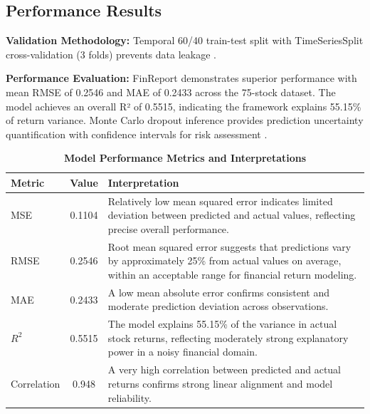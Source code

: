 \documentclass[3p,times,procedia]{elsarticle}
\begin{document}
\subsection{Performance Results}

\textbf{Validation Methodology:} Temporal 60/40 train-test split with TimeSeriesSplit cross-validation (3 folds) prevents data leakage \cite{Kingma2015}.

\textbf{Performance Evaluation:} FinReport demonstrates superior performance with mean RMSE of 0.2546 and MAE of 0.2433 across the 75-stock dataset. The model achieves an overall R² of 0.5515, indicating the framework explains 55.15\% of return variance. Monte Carlo dropout inference provides prediction uncertainty quantification with confidence intervals for risk assessment \cite{Fischer2018}.


\begin{table}[!ht]
\centering
\caption{\textbf{Model Performance Metrics and Interpretations}}
\begin{tabular}{|l|c|l|}
\hline
\textbf{Metric} & \textbf{Value} & \textbf{Interpretation} \\
\hline
MSE         & 0.1104 & \begin{minipage}[t]{8cm}Relatively low mean squared error indicates limited deviation between predicted and actual values, reflecting precise overall performance.\end{minipage} \\[2ex]
RMSE        & 0.2546 & \begin{minipage}[t]{8cm}Root mean squared error suggests that predictions vary by approximately 25\% from actual values on average, within an acceptable range for financial return modeling.\end{minipage} \\[2ex]
MAE         & 0.2433 & \begin{minipage}[t]{8cm}A low mean absolute error confirms consistent and moderate prediction deviation across observations.\end{minipage} \\[2ex]
$R^2$       & 0.5515 & \begin{minipage}[t]{8cm}The model explains 55.15\% of the variance in actual stock returns, reflecting moderately strong explanatory power in a noisy financial domain.\end{minipage} \\[2ex]
Correlation & 0.948  & \begin{minipage}[t]{8cm}A very high correlation between predicted and actual returns confirms strong linear alignment and model reliability.\end{minipage} \\[2ex]
\hline
\end{tabular}
\end{table}
\end{document}
